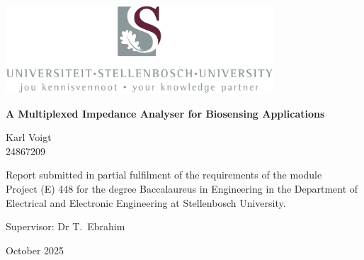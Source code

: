 \graphicspath{{frontmatter/fig/}}

\begin{titlepage}
	\begin{center}
		
		\includegraphics[width=10cm]{USlogo-top}
		
		\vfill
		
		{\sffamily \bfseries \huge A Multiplexed Impedance Analyser for Biosensing Applications \par}
		
		\vfill
		
		{\large {\Large Karl Voigt} \\ 24867209 \par}
		
		\vfill
		
		\vfill
		
		{Report submitted in partial fulfilment of the requirements of the module \\
			Project (E) 448 for the degree Baccalaureus in Engineering in the Department of
			Electrical and Electronic Engineering at Stellenbosch University. \par}
		
		\vfill
		
		{\large {Supervisor}: Dr T.\ Ebrahim} %
		
		\vfill
		
		{\Large October 2025}
	\end{center}
\end{titlepage}
